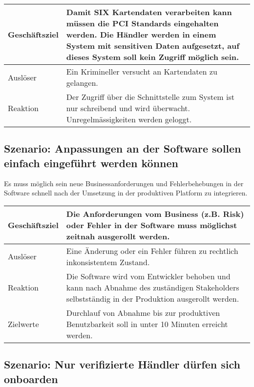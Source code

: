 \begin{table}[H]
	\centering
	\begin{tabular}{ | p{3cm} | p{11cm} | }
		\toprule
		Geschäftsziel & Damit SIX Kartendaten verarbeiten kann müssen die PCI Standards eingehalten werden. Die Händler werden in einem System mit sensitiven Daten aufgesetzt, auf dieses System soll kein Zugriff möglich sein. \\ \hline
		Auslöser & Ein Krimineller versucht an Kartendaten zu gelangen. \\ \hline
		Reaktion & Der Zugriff über die Schnittstelle zum System ist nur schreibend und wird überwacht. Unregelmässigkeiten werden geloggt. \\
		\bottomrule
	\end{tabular}
\end{table}

\subsection{Szenario: Anpassungen an der Software sollen einfach eingeführt werden können}

Es muss möglich sein neue Businessanforderungen und Fehlerbehebungen in der Software schnell nach der Umsetzung in der produktiven Platform zu integrieren. 

\begin{table}[H]
	\centering
	\begin{tabular}{ | p{3cm} | p{11cm} | }
		\toprule
		Geschäftsziel & Die Anforderungen vom Business (z.B. Risk) oder Fehler in der Software muss möglichst zeitnah ausgerollt werden. \\ \hline
		Auslöser & Eine Änderung oder ein Fehler führen zu rechtlich inkonsistentem Zustand. \\ \hline
		Reaktion & Die Software wird vom Entwickler behoben und kann nach Abnahme des zuständigen Stakeholders selbstständig in der Produktion ausgerollt werden. \\ \hline
		Zielwerte & Durchlauf von Abnahme bis zur produktiven Benutzbarkeit soll in unter 10 Minuten erreicht werden.\\
		\bottomrule
	\end{tabular}
\end{table}

\subsection{Szenario: Nur verifizierte Händler dürfen sich onboarden}

